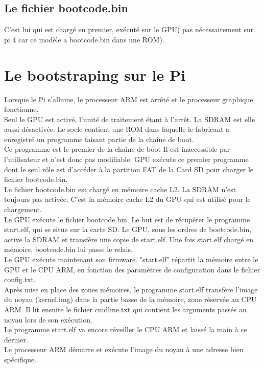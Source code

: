 \documentclass[12pt,a4paper,oneside]{book}
\begin{document}
 			\subsection{Le fichier bootcode.bin}
 		C'est lui qui est chargé en premier, exécuté sur le GPU( pas nécessairement sur pi 4 car ce modèle a bootcode.bin dans une ROM).
		\section{Le bootstraping sur le Pi}
			Lorsque le Pi s'allume, le processeur ARM est arrêté et le processeur graphique fonctionne.\\
		
		Seul le GPU est activé, l'unité de traitement étant à l'arrêt. La SDRAM est elle aussi désactivée. Le socle contient une ROM dans laquelle le fabricant a enregistré un programme faisant partie de la chaîne de boot.\\
		Ce programme est le premier de la chaîne de boot Il est inaccessible par l'utilisateur et n'est donc pas modifiable. GPU exécute ce premier programme dont le seul rôle est d'accéder à la partition FAT de la Card SD pour charger le fichier bootcode.bin.\\
		Le fichier bootcode.bin est chargé en mémoire cache L2. La SDRAM n'est toujours pas activée. C'est la mémoire cache L2 du GPU qui est utilisé pour le chargement.\\
		Le GPU exécute le fichier bootcode.bin. Le but est de récupérer le programme start.elf, qui se situe sur la carte SD. Le GPU, sous les ordres de bootcode.bin, active la SDRAM et transfère une copie de start.elf. Une fois start.elf chargé en mémoire, bootcode.bin lui passe le relais.\\
		Le GPU exécute maintenant son firmware. "start.elf" répartit la mémoire entre le GPU et le CPU ARM, en fonction des paramètres de configuration dans le fichier config.txt.\\
		Après mise en place des zones mémoires, le programme start.elf transfère l'image du noyau (kernel.img) dans la partie basse de la mémoire, zone réservée au CPU ARM. Il lit ensuite le fichier cmdline.txt qui contient les arguments passés au noyau lors de son exécution.\\
		Le programme start.elf va encore réveiller le CPU ARM et laissé la main à ce dernier.\\
		Le processeur ARM démarre et exécute l'image du noyau à une adresse bien spécifique.
		
		
	
\end{document}
